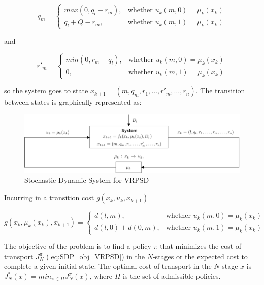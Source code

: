 \begin{equation}\label{eq:q_m}
    q_m = \left \{ \begin{array}{ll}
    max(0,q_l-r_m), & \text{whether } u_k(m,0)=\mu_k(x_k)\\
    q_l+Q-r_m, & \text{whether } u_k(m,1)=\mu_k(x_k)
    \end{array} \right.
 \end{equation}

and

\begin{equation}\label{eq:r_m}
    r'_m = \left \{ \begin{array}{ll}
    min(0,r_m - q_l), & \text{whether } u_k(m,0)=\mu_k(x_k)\\
    0, & \text{whether } u_k(m,1)=\mu_k(x_k)
    \end{array} \right.
 \end{equation}

so the system goes to state $x_{k+1} = (m,q_m,r_1,\ldots,r'_m,\ldots,r_n)$. The transition between states is graphically represented as:

\begin{figure}[!htbp]
  \begin{center}
   \includegraphics[width=1\textwidth]{Images/Chapter2/System_SDP.eps}
  \end{center}
    \caption{Stochastic Dynamic System for VRPSD}\label{fig:SDPS_VRPSD}
\end{figure}

Incurring in a transition cost $g(x_k,u_k,x_{k+1})$

\begin{equation}\label{eq:costg}
    g(x_k,\mu_k(x_k),x_{k+1}) = \left \{ \begin{array}{ll}
    d(l,m), & \text{whether } u_k(m,0)=\mu_k(x_k)\\
    d(l,0) + d(0,m), & \text{whether } u_k(m,1)=\mu_k(x_k)
    \end{array} \right.
 \end{equation}

The objective of the problem is to find a policy $\pi$ that minimizes the cost of transport $J_N^\pi$ (\ref{eq:SDP_obj_VRPSD}) in the $N$-stages or the expected cost to complete a given initial state. The optimal cost of transport in the $N$-stage $x$ is  $J_N^*(x) = min_{\pi\in \Pi}J_N^\pi(x)$, where $\Pi$ is the set of admissible policies. 

